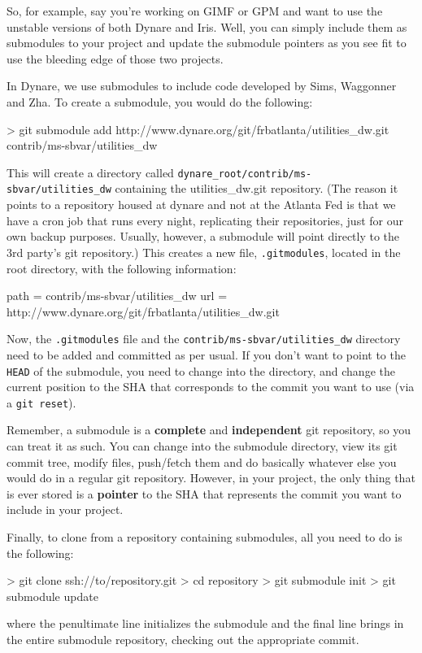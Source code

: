 \documentclass[10pt,letterpaper]{article}
\begin{document}
So, for example, say you're working on GIMF or GPM and want to use the unstable versions of both Dynare and Iris. Well, you can simply include them as submodules to your project and update the submodule pointers as you see fit to use the bleeding edge of those two projects.

In Dynare, we use submodules to include code developed by Sims, Waggonner and Zha. To create a submodule, you would do the following:
\begin{code}
> git submodule add http://www.dynare.org/git/frbatlanta/utilities_dw.git contrib/ms-sbvar/utilities_dw
\end{code}
\noindent This will create a directory called \texttt{dynare\_root/contrib/ms-sbvar/utilities\_dw} containing the utilities\_dw.git repository. (The reason it points to a repository housed at dynare and not at the Atlanta Fed is that we have a cron job that runs every night, replicating their repositories, just for our own backup purposes. Usually, however, a submodule will point directly to the 3rd party's git repository.) This creates a new file, \texttt{.gitmodules}, located in the root directory, with the following information:
\begin{code}
  path = contrib/ms-sbvar/utilities_dw
  url = http://www.dynare.org/git/frbatlanta/utilities_dw.git
\end{code}

Now, the \texttt{.gitmodules} file and the \texttt{contrib/ms-sbvar/utilities\_dw} directory need to be added and committed as per usual. If you don't want to point to the \texttt{HEAD} of the submodule, you need to change into the directory, and change the current position to the SHA that corresponds to the commit you want to use (via a \texttt{git reset}).

Remember, a submodule is a \textbf{complete} and \textbf{independent} git repository, so you can treat it as such. You can change into the submodule directory, view its git commit tree, modify files, push/fetch them and do basically whatever else you would do in a regular git repository. However, in your project, the only thing that is ever stored is a \textbf{pointer} to the SHA that represents the commit you want to include in your project.

Finally, to clone from a repository containing submodules, all you need to do is the following:
\begin{code}
> git clone ssh://to/repository.git
> cd repository
> git submodule init
> git submodule update
\end{code}
\noindent where the penultimate line initializes the submodule and the final line brings in the entire submodule repository, checking out the appropriate commit.
\end{document}
